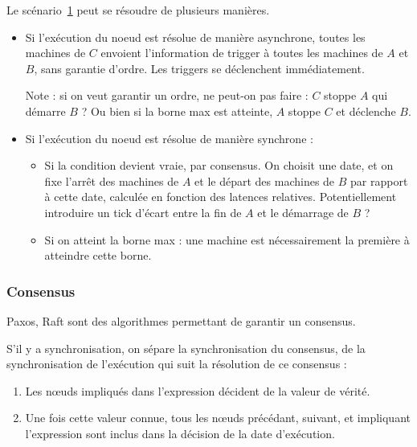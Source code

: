 \documentclass{article}
\begin{document}
\begin{figure}[h]
    \centering
    \begin{tikzpicture}
    
    \end{tikzpicture}
    \label{scenar.trigger-1}
\end{figure}

Le scénario~\ref{scenar.trigger-1} peut se résoudre de plusieurs manières.

\begin{itemize}
    \item Si l'exécution du noeud est résolue de manière asynchrone, toutes les machines de $C$ envoient l'information de trigger à toutes les machines de $A$ et $B$, sans garantie d'ordre. Les triggers se déclenchent immédiatement.
    
    Note : si on veut garantir un ordre, ne peut-on pas faire : $C$ stoppe $A$ qui démarre $B$ ? Ou bien si la borne max est atteinte, $A$ stoppe $C$ et déclenche $B$.
    
    \item Si l'exécution du noeud est résolue de manière synchrone : 
    \begin{itemize}
        \item Si la condition devient vraie, par consensus. On choisit une date, et on fixe l'arrêt des machines de $A$ et le départ des machines de $B$ par rapport à cette date, calculée en fonction des latences relatives. Potentiellement introduire un tick d'écart entre la fin de $A$ et le démarrage de $B$ ?
        \item Si on atteint la borne max : une machine est nécessairement la première à atteindre cette borne.
    \end{itemize}
\end{itemize}

\subsubsection{Consensus}
Paxos, Raft sont des algorithmes permettant de garantir un consensus.%


S'il y a synchronisation, on sépare la synchronisation du consensus, de la synchronisation de l'exécution qui suit la résolution de ce consensus : 
\begin{enumerate}
    \item Les n\oe uds impliqués dans l'expression décident de la valeur de vérité.
    \item Une fois cette valeur connue, tous les n\oe uds précédant, suivant, et impliquant l'expression sont inclus dans la décision de la date d'exécution.
\end{enumerate}
\end{document}
